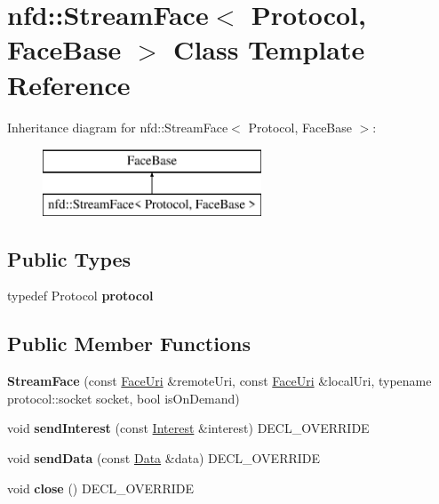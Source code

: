 \hypertarget{classnfd_1_1StreamFace}{}\section{nfd\+:\+:Stream\+Face$<$ Protocol, Face\+Base $>$ Class Template Reference}
\label{classnfd_1_1StreamFace}
Inheritance diagram for nfd\+:\+:Stream\+Face$<$ Protocol, Face\+Base $>$\+:\begin{figure}[H]
\begin{center}
\leavevmode
\includegraphics[height=2.000000cm]{classnfd_1_1StreamFace}
\end{center}
\end{figure}
\subsection*{Public Types}
\begin{DoxyCompactItemize}
\item 
typedef Protocol {\bfseries protocol}\hypertarget{classnfd_1_1StreamFace_a4271f95ffe86272fcd25f0c776769d36}{}\label{classnfd_1_1StreamFace_a4271f95ffe86272fcd25f0c776769d36}

\end{DoxyCompactItemize}
\subsection*{Public Member Functions}
\begin{DoxyCompactItemize}
\item 
{\bfseries Stream\+Face} (const \hyperlink{classndn_1_1util_1_1FaceUri}{Face\+Uri} \&remote\+Uri, const \hyperlink{classndn_1_1util_1_1FaceUri}{Face\+Uri} \&local\+Uri, typename protocol\+::socket socket, bool is\+On\+Demand)\hypertarget{classnfd_1_1StreamFace_ac3392ae8ded031d7fd43762ebb2e6a83}{}\label{classnfd_1_1StreamFace_ac3392ae8ded031d7fd43762ebb2e6a83}

\item 
void {\bfseries send\+Interest} (const \hyperlink{classndn_1_1Interest}{Interest} \&interest) D\+E\+C\+L\+\_\+\+O\+V\+E\+R\+R\+I\+DE\hypertarget{classnfd_1_1StreamFace_a9be685193e73982b71b5797ffa96ed51}{}\label{classnfd_1_1StreamFace_a9be685193e73982b71b5797ffa96ed51}

\item 
void {\bfseries send\+Data} (const \hyperlink{classndn_1_1Data}{Data} \&data) D\+E\+C\+L\+\_\+\+O\+V\+E\+R\+R\+I\+DE\hypertarget{classnfd_1_1StreamFace_ab10e99ae87bc8ad069d6a804f39f9048}{}\label{classnfd_1_1StreamFace_ab10e99ae87bc8ad069d6a804f39f9048}

\item 
void {\bfseries close} () D\+E\+C\+L\+\_\+\+O\+V\+E\+R\+R\+I\+DE\hypertarget{classnfd_1_1StreamFace_a4e436f0e5dbcdf8e8fdf3a0ad0d5eb9d}{}\label{classnfd_1_1StreamFace_a4e436f0e5dbcdf8e8fdf3a0ad0d5eb9d}

\end{DoxyCompactItemize}
